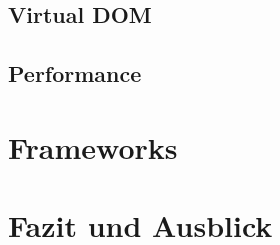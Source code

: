 \documentclass[runningheads]{llncs}
\begin{document}
\subsection{Virtual DOM}
\label{subsec:Virtual DOM}

\subsection{Performance}
\label{subsec:Virtual DOM}

\section{Frameworks}
\label{sec:Evaluation}



\section{Fazit und Ausblick}
\label{sec:Fazit}



%

\newpage

\end{document}
